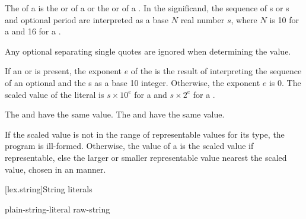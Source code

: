 \pnum
{}%
The  of a 
is the  or 
of a 
or the 
or 
of a .
In the significand,
the sequence of s or s
and optional period are interpreted as a base $N$ real number $s$,
where $N$ is 10 for a  and
16 for a .
\begin{note}
Any optional separating single quotes are ignored when determining the value.
\end{note}
If an  or 
is present,
the exponent $e$ of the 
is the result of interpreting
the sequence of an optional  and the s
as a base 10 integer.
Otherwise, the exponent $e$ is 0.
The scaled value of the literal is
$s \times 10^e$ for a  and
$s \times 2^e$ for a .
\begin{example}
The 
 and  have the same value.
The 
 and 
have the same value.
\end{example}

\pnum
If the scaled value is not in the range of representable
values for its type, the program is ill-formed.
Otherwise, the value of a 
is the scaled value if representable,
else the larger or smaller representable value nearest the scaled value,
chosen in an  manner.

[lex.string]{String literals}

%
\begin{bnf}
\br
     plain-string-literal\br
      raw-string
\end{bnf}

\begin{bnf}
\br
      
\end{bnf}

